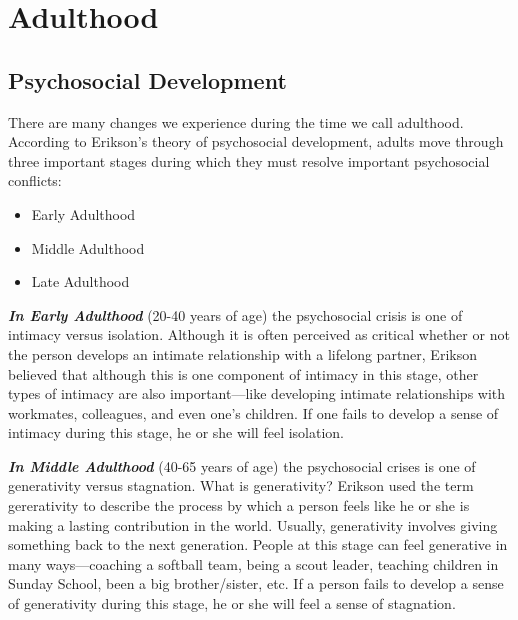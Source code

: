\documentclass[
]{book}
\providecommand{\tightlist}{%
  \setlength{\itemsep}{0pt}\setlength{\parskip}{0pt}}
\begin{document}
\hypertarget{adulthood}{%
\section{Adulthood}\label{adulthood}}

\hypertarget{psychosocial-development}{%
\subsection*{Psychosocial Development}\label{psychosocial-development}}

There are many changes we experience during the time we call adulthood. According to Erikson's theory of psychosocial development, adults move through three important stages during which they must resolve important psychosocial conflicts:

\begin{itemize}
\tightlist
\item
  Early Adulthood\\
\item
  Middle Adulthood\\
\item
  Late Adulthood
\end{itemize}

\textbf{\emph{In Early Adulthood}} (20-40 years of age) the psychosocial crisis is one of intimacy versus isolation. Although it is often perceived as critical whether or not the person develops an intimate relationship with a lifelong partner, Erikson believed that although this is one component of intimacy in this stage, other types of intimacy are also important---like developing intimate relationships with workmates, colleagues, and even one's children. If one fails to develop a sense of intimacy during this stage, he or she will feel isolation.

\textbf{\emph{In Middle Adulthood}} (40-65 years of age) the psychosocial crises is one of generativity versus stagnation. What is generativity? Erikson used the term gererativity to describe the process by which a person feels like he or she is making a lasting contribution in the world. Usually, generativity involves giving something back to the next generation. People at this stage can feel generative in many ways---coaching a softball team, being a scout leader, teaching children in Sunday School, been a big brother/sister, etc. If a person fails to develop a sense of generativity during this stage, he or she will feel a sense of stagnation.
\end{document}
